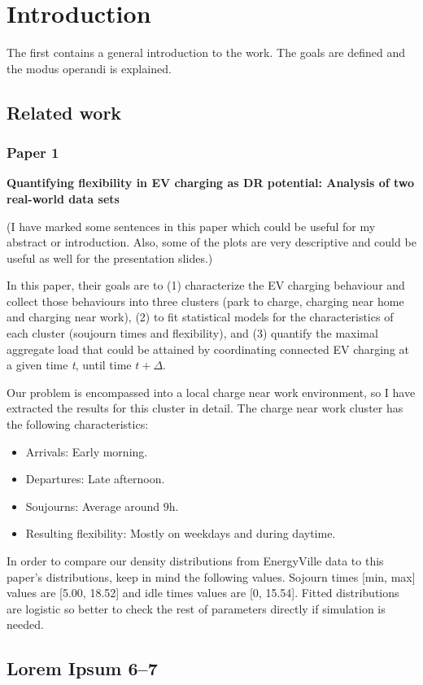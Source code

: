 \chapter{Introduction}
\label{cha:intro}
The first contains a general introduction to the work. The goals are defined and the modus operandi is explained.

\section{Related work}
\subsection{Paper 1}
\textbf{Quantifying flexibility in EV charging as DR potential: Analysis of two real-world data sets}

(I have marked some sentences in this paper which could be useful for my abstract or introduction. Also, some of the plots are very descriptive and could be useful as well for the presentation slides.)

In this paper, their goals are to (1) characterize the EV charging behaviour and collect those behaviours into three clusters (park to charge, charging near home and charging near work), (2) to fit statistical models for the characteristics of each cluster (soujourn times and flexibility), and (3) quantify the maximal aggregate load that could be attained by coordinating connected EV charging at a given time \emph{t}, until time $t+\Delta$.

Our problem is encompassed into a local charge near work environment, so I have extracted the results for this cluster in detail. The charge near work cluster has the following characteristics:

\begin{itemize}
  \item Arrivals: Early morning.
  \item Departures: Late afternoon.
  \item Soujourns: Average around 9h.
  \item Resulting flexibility: Mostly on weekdays and during daytime.
\end{itemize}

In order to compare our density distributions from EnergyVille data to this paper's distributions, keep in mind the following values. Sojourn times [min, max] values are [5.00, 18.52] and idle times values are [0, 15.54]. Fitted distributions are logistic so better to check the rest of parameters directly if simulation is needed.


\section{Lorem Ipsum 6--7}
\lipsum[6-7]

